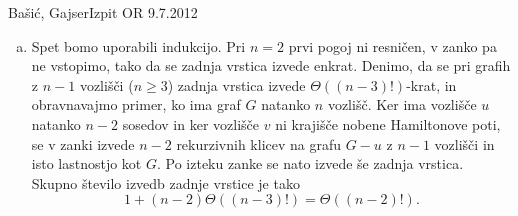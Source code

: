\begin{naloga}{Bašić, Gajser}{Izpit OR 9.7.2012}
\begin{odgovor}
\begin{enumerate}[(a)]
\item Spet bomo uporabili indukcijo.
Pri $n = 2$ prvi pogoj ni resničen,
v zanko pa ne vstopimo, tako da se zadnja vrstica izvede enkrat.
Denimo, da se pri grafih z $n-1$ vozlišči ($n \ge 3$)
zadnja vrstica izvede $\Theta((n-3)!)$-krat,
in obravnavajmo primer, ko ima graf $G$ natanko $n$ vozlišč.
Ker ima vozlišče $u$ natanko $n-2$ sosedov
in ker vozlišče $v$ ni krajišče nobene Hamiltonove poti,
se v zanki izvede $n-2$ rekurzivnih klicev
na grafu $G-u$ z $n-1$ vozlišči in isto lastnostjo kot $G$.
Po izteku zanke se nato izvede še zadnja vrstica.
Skupno število izvedb zadnje vrstice je tako
$$
1 + (n-2) \Theta((n-3)!) = \Theta((n-2)!) .
$$
\end{enumerate}
\end{odgovor}
\end{naloga}
